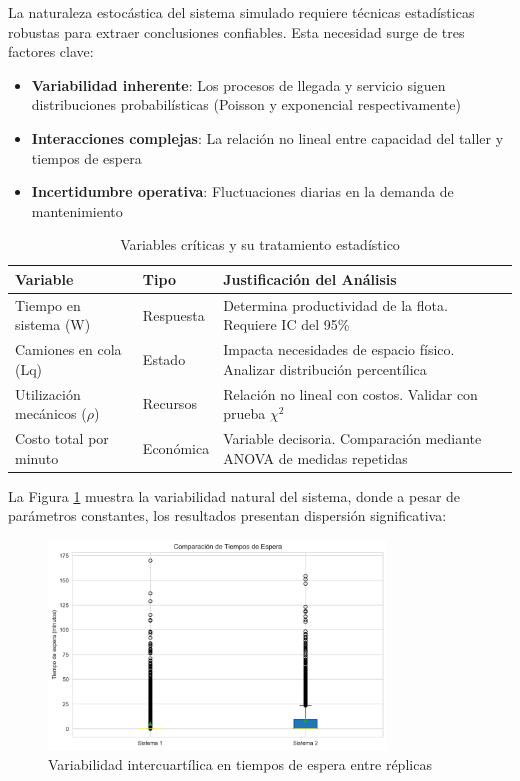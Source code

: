 \documentclass[a4paper, 12pt]{article}
\begin{document}
  La naturaleza estocástica del sistema simulado requiere técnicas estadísticas robustas para extraer conclusiones confiables. Esta necesidad surge de tres factores clave:
  
  \begin{itemize}
  	\item \textbf{Variabilidad inherente}: Los procesos de llegada y servicio siguen distribuciones probabilísticas (Poisson y exponencial respectivamente)
  	\item \textbf{Interacciones complejas}: La relación no lineal entre capacidad del taller y tiempos de espera
  	\item \textbf{Incertidumbre operativa}: Fluctuaciones diarias en la demanda de mantenimiento
  \end{itemize}
  
  \begin{table}[H]
  	\centering
  	\begin{tabular}{p{4cm}p{3cm}p{7cm}}
  		\toprule
  		\textbf{Variable} & \textbf{Tipo} & \textbf{Justificación del Análisis} \\
  		\midrule
  		Tiempo en sistema (W) & Respuesta & Determina productividad de la flota. Requiere IC del 95\% \\
  		Camiones en cola (Lq) & Estado & Impacta necesidades de espacio físico. Analizar distribución percentílica \\
  		Utilización mecánicos ($\rho$) & Recursos & Relación no lineal con costos. Validar con prueba $\chi^2$ \\
  		Costo total por minuto & Económica & Variable decisoria. Comparación mediante ANOVA de medidas repetidas \\
  		\bottomrule
  	\end{tabular}
  	\caption{Variables críticas y su tratamiento estadístico}
  	\label{tab:variables}
  \end{table}
  
  La Figura \ref{fig:variabilidad} muestra la variabilidad natural del sistema, donde a pesar de parámetros constantes, los resultados presentan dispersión significativa:
  
  \begin{figure}[H]
  	\centering
  	\includegraphics[width=0.8\textwidth]{figures/boxplot_comparison.png}
  	\caption{Variabilidad intercuartílica en tiempos de espera entre réplicas}
  	\label{fig:variabilidad}
  \end{figure}
  
\end{document}
